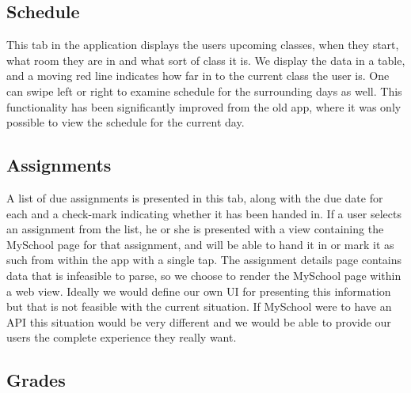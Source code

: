 \documentclass[pdftex, DIV=calc, paper=a4, fontsize=11pt]{scrartcl}	 %
\begin{document}
\subsection{Schedule}

This tab in the application displays the users upcoming classes, when they start, what room they
are in and what sort of class it is. We display the data in a table, and a moving red line indicates
how far in to the current class the user is. One can swipe left or right to examine schedule for
the surrounding days as well. This functionality has been significantly improved from the old app,
where it was only possible to view the schedule for the current day.

\subsection{Assignments}

A list of due assignments is presented in this tab, along with the due date for each and a check-mark
indicating whether it has been handed in. If a user selects an assignment from the list, he or she
is presented with a view containing the MySchool page for that assignment, and will be able to hand
it in or mark it as such from within the app with a single tap. The assignment details page contains
data that is infeasible to parse, so we choose to render the MySchool page within a web view. Ideally
we would define our own UI for presenting this information but that is not feasible with the current
situation. If MySchool were to have an API this situation would be very different and we would be
able to provide our users the complete experience they really want.

\subsection{Grades}
\end{document}
